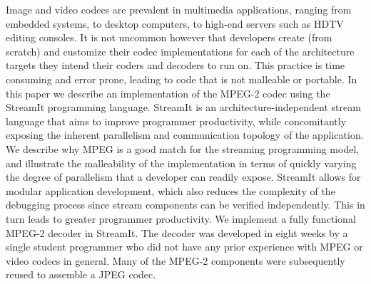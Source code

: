 Image and video codecs are prevalent in multimedia applications,
ranging from embedded systems, to desktop computers, to high-end
servers such as HDTV editing consoles. It is not uncommon however
that developers create (from scratch) and customize their codec
implementations for each of the architecture targets they intend their
coders and decoders to run on. This practice is time consuming and
error prone, leading to code that is not malleable or portable.  In
this paper we describe an implementation of the MPEG-2 codec using the
StreamIt programming language. StreamIt is an architecture-independent
stream language that aims to improve programmer productivity, while
concomitantly exposing the inherent parallelism and communication
topology of the application.  We describe why MPEG is a good match for
the streaming programming model, and illustrate the malleability of
the implementation in terms of quickly varying the degree of
parallelism that a developer can readily expose. StreamIt allows for
modular application development, which also reduces the complexity of
the debugging process since stream components can be verified
independently. This in turn leads to greater programmer productivity.
We implement a fully functional MPEG-2 decoder in StreamIt. The
decoder was developed in eight weeks by a single student programmer
who did not have any prior experience with MPEG or video codecs in
general. Many of the MPEG-2 components were subsequently reused to
assemble a JPEG codec.
